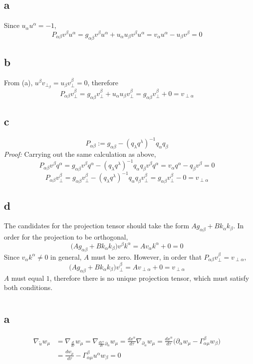 \documentclass{article}
\begin{document}
\subsection*{a}
Since $u_\alpha u^\alpha  = -1$,
\[
	P_{\alpha\beta}v^\beta u^\alpha = g_{\alpha\beta} v^\beta u^\alpha +  u_{\alpha}u_{\beta} v^\beta u^\alpha
	= v_\alpha u^\alpha - u_\beta v^\beta = 0
\]
\subsection*{b}
From (a), $u^\beta v_{\perp_\beta} = u_{\beta} v_{\perp}^\beta = 0$, therefore
\[
	P_{\alpha\beta}v_{\perp}^\beta =  g_{\alpha\beta} v_{\perp}^\beta +  u_{\alpha}u_{\beta} v_{\perp}^\beta
	=  g_{\alpha\beta} v_{\perp}^\beta +  0 = v_{\perp\alpha}
\]
\subsection*{c}
\[
	P_{\alpha\beta} := g_{\alpha\beta}  - ({q_\lambda q^\lambda})^{-1} q_{\alpha}q_{\beta}
\]
\textit{Proof:} Carrying out the same calculation as above,
\[  P_{\alpha\beta}v^\beta q^\alpha = g_{\alpha\beta} v^\beta q^\alpha - ({q_\lambda q^\lambda})^{-1} q_{\alpha}q_{\beta} v^\beta q^\alpha = v_\alpha q^\alpha - q_\beta v^\beta = 0 \]
\[
	P_{\alpha\beta}v_{\perp}^\beta =  g_{\alpha\beta} v_{\perp}^\beta  - ({q_\lambda q^\lambda})^{-1} q_{\alpha}q_{\beta}  v_{\perp}^\beta
	=  g_{\alpha\beta} v_{\perp}^\beta - 0 = v_{\perp\alpha}
\]
\subsection*{d}
The candidates for the projection tensor should take the form $Ag_{\alpha\beta} + Bk_\alpha k_\beta$. In order for the projection to be orthogonal,
\[  \Big(Ag_{\alpha\beta} + Bk_\alpha k_\beta\Big)v^\beta k^\alpha = Av_\alpha k^\alpha + 0 = 0 \]
Since $v_\alpha k^\alpha \neq 0$ in general, $A$ must be zero. However, in order that $P_{\alpha\beta}v_\perp^\beta = v_{\perp\alpha}$,
\[ \Big(Ag_{\alpha\beta} + Bk_\alpha k_\beta\Big)v_\perp^\beta = Av_{\perp\alpha} + 0 = v_{\perp\alpha} \]
$A$ must equal $1$, therefore there is no unique projection tensor, which must satisfy both conditions.

\section{}
\subsection*{a}
\begin{align*}
 \nabla_{\utilde{u}}w_\mu &= \nabla_{\frac{d}{d\tau}}w_\mu = \nabla_{\frac{dx^\alpha}{d\tau}\partial_\alpha}w_\mu
= \frac{dx^\alpha}{d\tau} \nabla_{\partial_\alpha}w_\mu
= \frac{dx^\alpha}{d\tau} \Big(\partial_\alpha w_\mu - \Gamma^{\beta}_{\alpha\mu}w_\beta \Big) \\
&= \frac{dw_\mu}{d\tau} - \Gamma^\beta_{\alpha\mu}u^\alpha w_\beta = 0
\end{align*}
\end{document}
